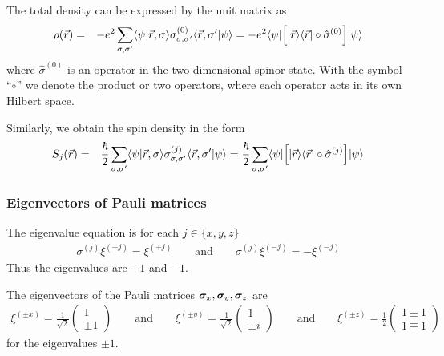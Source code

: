 \documentclass[11pt,a4paper]{report}
\begin{document}
The total density can be expressed by the unit matrix as
\begin{eqnarray*}
\rho(\vec{r})
&=&
-e^2 \sum_{\sigma,\sigma'}
\langle \psi|\vec{r},\sigma\rangle
\sigma^{(0)}_{\sigma,\sigma'}\langle\vec{r},\sigma'|\psi\rangle
=
-e^2 
\langle \psi|\Bigl[|\vec{r}\rangle\langle\vec{r}|\circ \hat{\sigma}^{(0)}\Bigr]
|\psi\rangle
\end{eqnarray*}
where $\hat{\sigma}^{(0)}$ is an operator in the two-dimensional
spinor state.  With the symbol ``$\circ$'' we denote the product or
two operators, where each operator acts in its own Hilbert space.


Similarly, we obtain the spin density in the form
\begin{eqnarray*}
S_j(\vec{r})
&=&
\frac{\hbar}{2}\sum_{\sigma,\sigma'}
\langle \psi|\vec{r},\sigma\rangle
\sigma^{(j)}_{\sigma,\sigma'}\langle\vec{r},\sigma'|\psi\rangle
=
\frac{\hbar}{2}\sum_{\sigma,\sigma'}
\langle \psi|\Bigl[|\vec{r}\rangle\langle\vec{r}|\circ\hat{\sigma}^{(j)}\Bigr]
|\psi\rangle
\end{eqnarray*}



\subsubsection{Eigenvectors of Pauli matrices}
The eigenvalue equation is for each $j\in\{x,y,z\}$
\begin{eqnarray}
\sigma^{(j)}\xi^{(+j)}=\xi^{(+j)}
\qquad\text{and}\qquad
\sigma^{(j)}\xi^{(-j)}=-\xi^{(-j)}
\end{eqnarray}
Thus the eigenvalues are $+1$ and $-1$.

The eigenvectors of the Pauli matrices
$\bm{\sigma}_x,\bm{\sigma}_y,\bm{\sigma}_z$ are
\begin{eqnarray}
\xi^{(\pm x)}=\frac{1}{\sqrt{2}}\left(\begin{array}{c}1\\\pm1\end{array}\right)
\qquad\text{and}\qquad
\xi^{(\pm y)}=\frac{1}{\sqrt{2}}\left(\begin{array}{c}1\\\pm i\end{array}\right)
\qquad\text{and}\qquad
\xi^{(\pm z)}=\frac{1}{2}\left(\begin{array}{c}1\pm1\\1\mp1\end{array}\right)
\label{eq:spineigenstatesxyz}
\end{eqnarray}
for the eigenvalues $\pm1$. 
\end{document}
